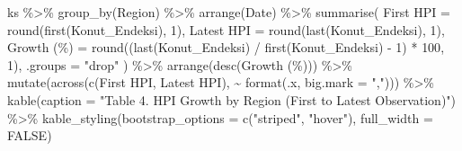 \documentclass[
  11pt,
  a4paper,
]{article}
\newenvironment{Shaded}{\begin{snugshade}}{\end{snugshade}}
\newcommand{\AttributeTok}[1]{\textcolor[rgb]{0.40,0.45,0.13}{#1}}
\newcommand{\ConstantTok}[1]{\textcolor[rgb]{0.56,0.35,0.01}{#1}}
\newcommand{\DecValTok}[1]{\textcolor[rgb]{0.68,0.00,0.00}{#1}}
\newcommand{\FunctionTok}[1]{\textcolor[rgb]{0.28,0.35,0.67}{#1}}
\newcommand{\NormalTok}[1]{\textcolor[rgb]{0.00,0.23,0.31}{#1}}
\newcommand{\OtherTok}[1]{\textcolor[rgb]{0.00,0.23,0.31}{#1}}
\newcommand{\SpecialCharTok}[1]{\textcolor[rgb]{0.37,0.37,0.37}{#1}}
\newcommand{\StringTok}[1]{\textcolor[rgb]{0.13,0.47,0.30}{#1}}
\begin{document}
\begin{Shaded}
\begin{Highlighting}[]
\NormalTok{ks }\SpecialCharTok{\%\textgreater{}\%}
  \FunctionTok{group\_by}\NormalTok{(Region) }\SpecialCharTok{\%\textgreater{}\%}
  \FunctionTok{arrange}\NormalTok{(Date) }\SpecialCharTok{\%\textgreater{}\%}
  \FunctionTok{summarise}\NormalTok{(}
    \StringTok{\textasciigrave{}}\AttributeTok{First HPI}\StringTok{\textasciigrave{}}  \OtherTok{=} \FunctionTok{round}\NormalTok{(}\FunctionTok{first}\NormalTok{(Konut\_Endeksi), }\DecValTok{1}\NormalTok{),}
    \StringTok{\textasciigrave{}}\AttributeTok{Latest HPI}\StringTok{\textasciigrave{}} \OtherTok{=} \FunctionTok{round}\NormalTok{(}\FunctionTok{last}\NormalTok{(Konut\_Endeksi), }\DecValTok{1}\NormalTok{),}
    \StringTok{\textasciigrave{}}\AttributeTok{Growth (\%)}\StringTok{\textasciigrave{}}  \OtherTok{=} \FunctionTok{round}\NormalTok{((}\FunctionTok{last}\NormalTok{(Konut\_Endeksi) }\SpecialCharTok{/} \FunctionTok{first}\NormalTok{(Konut\_Endeksi) }\SpecialCharTok{{-}} \DecValTok{1}\NormalTok{) }\SpecialCharTok{*} \DecValTok{100}\NormalTok{, }\DecValTok{1}\NormalTok{),}
    \AttributeTok{.groups =} \StringTok{"drop"}
\NormalTok{  ) }\SpecialCharTok{\%\textgreater{}\%}
  \FunctionTok{arrange}\NormalTok{(}\FunctionTok{desc}\NormalTok{(}\StringTok{\textasciigrave{}}\AttributeTok{Growth (\%)}\StringTok{\textasciigrave{}}\NormalTok{)) }\SpecialCharTok{\%\textgreater{}\%}
  \FunctionTok{mutate}\NormalTok{(}\FunctionTok{across}\NormalTok{(}\FunctionTok{c}\NormalTok{(}\StringTok{\textasciigrave{}}\AttributeTok{First HPI}\StringTok{\textasciigrave{}}\NormalTok{, }\StringTok{\textasciigrave{}}\AttributeTok{Latest HPI}\StringTok{\textasciigrave{}}\NormalTok{), }\SpecialCharTok{\textasciitilde{}} \FunctionTok{format}\NormalTok{(.x, }\AttributeTok{big.mark =} \StringTok{","}\NormalTok{))) }\SpecialCharTok{\%\textgreater{}\%}
  \FunctionTok{kable}\NormalTok{(}\AttributeTok{caption =} \StringTok{"Table 4. HPI Growth by Region (First to Latest Observation)"}\NormalTok{) }\SpecialCharTok{\%\textgreater{}\%}
  \FunctionTok{kable\_styling}\NormalTok{(}\AttributeTok{bootstrap\_options =} \FunctionTok{c}\NormalTok{(}\StringTok{"striped"}\NormalTok{, }\StringTok{"hover"}\NormalTok{), }\AttributeTok{full\_width =} \ConstantTok{FALSE}\NormalTok{)}
\end{Highlighting}
\end{Shaded}
\end{document}
